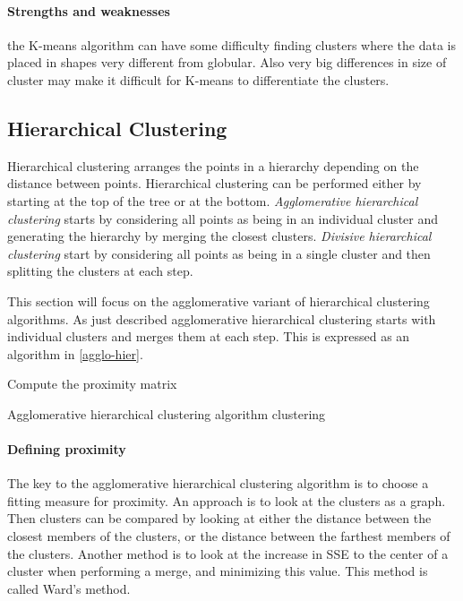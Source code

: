 \paragraph{Strengths and weaknesses}
the K-means algorithm can have some difficulty finding clusters where the data is placed in shapes very different from globular. 
Also very big differences in size of cluster may make it difficult for K-means to differentiate the clusters.



\subsection{Hierarchical Clustering}

Hierarchical clustering arranges the points in a hierarchy depending on the distance between points.
Hierarchical clustering can be performed either by starting at the top of the tree or at the bottom.
\textit{Agglomerative hierarchical clustering} starts by considering all points as being in an individual cluster and generating the hierarchy by merging the closest clusters. 
\textit{Divisive hierarchical clustering} start by considering all points as being in a single cluster and then splitting the clusters at each step.

This section will focus on the agglomerative variant of hierarchical clustering algorithms.
As just described agglomerative hierarchical clustering starts with individual clusters and merges them at each step.
This is expressed as an algorithm in \cref{agglo-hier}.

\begin{algorithm}
\SetAlgoLined
{}

Compute the proximity matrix\\
\caption{Agglomerative hierarchical clustering algorithm clustering}\label{agglo-hier}
\end{algorithm}

\paragraph{Defining proximity}
The key to the agglomerative hierarchical clustering algorithm is to choose a fitting measure for proximity.
An approach is to look at the clusters as a graph.
Then clusters can be compared by looking at either the distance between the closest members of the clusters, or the distance between the farthest members of the clusters.
Another method is to look at the increase in SSE to the center of a cluster when performing a merge, and minimizing this value.
This method is called Ward's method.

